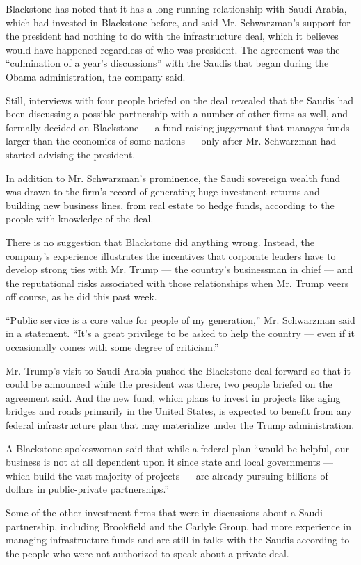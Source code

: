 Blackstone has noted that it has a long-running relationship with Saudi
Arabia, which had invested in Blackstone before, and said Mr.
Schwarzman's support for the president had nothing to do with the
infrastructure deal, which it believes would have happened regardless of
who was president. The agreement was the ``culmination of a year's
discussions'' with the Saudis that began during the Obama
administration, the company said.

Still, interviews with four people briefed on the deal revealed that the
Saudis had been discussing a possible partnership with a number of other
firms as well, and formally decided on Blackstone --- a fund-raising
juggernaut that manages funds larger than the economies of some nations
--- only after Mr. Schwarzman had started advising the president.

In addition to Mr. Schwarzman's prominence, the Saudi sovereign wealth
fund was drawn to the firm's record of generating huge investment
returns and building new business lines, from real estate to hedge
funds, according to the people with knowledge of the deal.

There is no suggestion that Blackstone did anything wrong. Instead, the
company's experience illustrates the incentives that corporate leaders
have to develop strong ties with Mr. Trump --- the country's businessman
in chief --- and the reputational risks associated with those
relationships when Mr. Trump veers off course, as he did this past week.

``Public service is a core value for people of my generation,'' Mr.
Schwarzman said in a statement. ``It's a great privilege to be asked to
help the country --- even if it occasionally comes with some degree of
criticism.''

Mr. Trump's visit to Saudi Arabia pushed the Blackstone deal forward so
that it could be announced while the president was there, two people
briefed on the agreement said. And the new fund, which plans to invest
in projects like aging bridges and roads primarily in the United States,
is expected to benefit from any federal infrastructure plan that may
materialize under the Trump administration.

A Blackstone spokeswoman said that while a federal plan ``would be
helpful, our business is not at all dependent upon it since state and
local governments --- which build the vast majority of projects --- are
already pursuing billions of dollars in public-private partnerships.''

Some of the other investment firms that were in discussions about a
Saudi partnership, including Brookfield and the Carlyle Group, had more
experience in managing infrastructure funds and are still in talks with
the Saudis according to the people who were not authorized to speak
about a private deal.

